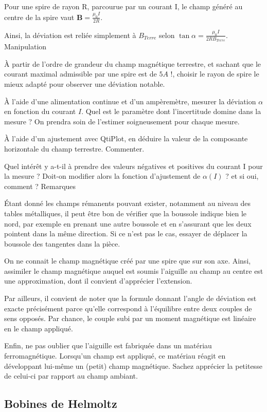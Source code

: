 \documentclass{article}%
\begin{document}
Pour une spire de rayon R, parcourue par un courant I, le champ généré au centre de la spire vaut
$\mathbf{B}=\frac{\mu_0 I}{2R}$.

Ainsi, la déviation est reliée simplement à $B_{Terre}$ selon
$\tan \alpha=\frac{\mu_0 I}{2 R B_{Terre}}$.
Manipulation

À partir de l'ordre de grandeur du champ magnétique terrestre, et sachant que le courant maximal admissible par une spire est de $5 A$ !, choisir le rayon de spire le mieux adapté pour observer une déviation notable.

À l'aide d'une alimentation continue et d'un ampèremètre, mesurer la déviation $\alpha$ en fonction du courant $I$. Quel est le paramètre dont l'incertitude domine dans la mesure ? On prendra soin de l'estimer soigneusement pour chaque mesure.

À l'aide d'un ajustement avec QtiPlot, en déduire la valeur de la composante horizontale du champ terrestre. Commenter.

Quel intérêt y a-t-il à prendre des valeurs négatives et positives du courant I pour la mesure ? Doit-on modifier alors la fonction d'ajustement de $\alpha(I)$ ? et si oui, comment ?
Remarques

Étant donné les champs rémanents pouvant exister, notamment au niveau des tables métalliques, il peut être bon de vérifier que la boussole indique bien le nord, par exemple en prenant une autre boussole et en s'assurant que les deux pointent dans la même direction. Si ce n'est pas le cas, essayer de déplacer la boussole des tangentes dans la pièce.

On ne connait le champ magnétique créé par une spire que sur son axe. Ainsi, assimiler le champ magnétique auquel est soumis l'aiguille au champ au centre est une approximation, dont il convient d'apprécier l'extension.

Par ailleurs, il convient de noter que la formule donnant l'angle de déviation est exacte précisément parce qu'elle correspond à l'équilibre entre deux couples de sens opposés. Par chance, le couple subi par un moment magnétique est linéaire en le champ appliqué.

Enfin, ne pas oublier que l'aiguille est fabriquée dans un matériau ferromagnétique. Lorsqu'un champ est appliqué, ce matériau réagit en développant lui-même un (petit) champ magnétique. Sachez apprécier la petitesse de celui-ci par rapport au champ ambiant. 

\subsection{Bobines de Helmoltz}
\end{document}

